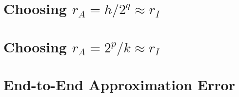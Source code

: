 
\section[Choosing $r_A = h/2^q \approx r_I$]
        {Choosing \mbox{\boldmath $r_A = h/2^q \approx r_I$}}

\label{crla1:slcr1}



\section[Choosing $r_A = 2^p/k \approx r_I$]
        {Choosing \mbox{\boldmath $r_A = 2^p/k \approx r_I$}}

\label{crla1:slcr2}



\section{End-to-End Approximation Error}

\label{crla1:sete2}

